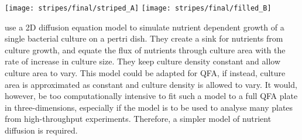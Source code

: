 \begin{Figure}
  \centering
  \texttt{[image: stripes/final/striped\_A]}
  \texttt{[image: stripes/final/filled\_B]}
  \label{fig:stripes_images}
\end{Figure}

\citet{Reo2014} use a 2D diffusion equation model to simulate nutrient
dependent growth of a single bacterial culture on a pertri dish. They
create a sink for nutrients from culture growth, and equate the flux
of nutrients through culture area with the rate of increase in culture
size. They keep culture density constant and allow culture area to
vary. This model could be adapted for QFA, if instead, culture area is
approximated as constant and culture density is allowed to vary. It
would, however, be too computationally intensive to fit such a model
to a full QFA plate in three-dimensions, especially if the model is to
be used to analyse many plates from high-throughput
experiments. Therefore, a simpler model of nutrient diffusion is
required.

